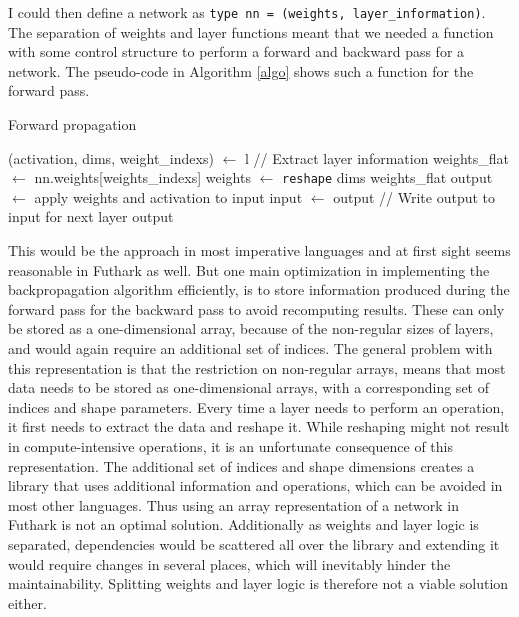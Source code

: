 I could then define a network as \texttt{type nn =  (weights,
	layer\_information)}. 
The separation of weights and layer functions meant that we needed a function
with some control structure to perform a forward and backward pass for a
network. 
The pseudo-code in Algorithm \ref{algo} shows such a function for the forward
pass.  
\begin{algorithm}[!htbp]
	\caption{Forward propagation}
	\begin{algorithmic}[1]
		\State  (activation, dims, weight\_indexs) $\gets$ l    // Extract layer
		information
		\State  weights\_flat $\gets$ nn.weights[weights\_indexs]
		\State  weights $\gets$ \texttt{reshape} dims weights\_flat
		\State  output $\gets$ apply weights and activation to input
		\State  input $\gets$ output // Write output to input for next layer  
		\EndFor
		\Return output
		\EndProcedure
	\end{algorithmic}
	\label{algo}
\end{algorithm} 
This would be the approach in most imperative languages and at first sight seems
reasonable in Futhark as well. 
But one main optimization in implementing the backpropagation algorithm
efficiently, is to store information produced during the forward pass for the
backward pass to avoid recomputing results. 
These can only be stored as a one-dimensional array, because of the non-regular
sizes of layers, and would again require an additional set of indices. 
The general problem with this representation is that the restriction on
non-regular arrays, means that most data needs to be stored as one-dimensional
arrays, with a corresponding set of indices and shape parameters. 
Every time a layer needs to perform an operation, it first needs to extract the
data and reshape it. 
While reshaping might not result in compute-intensive operations, it is an
unfortunate consequence of this representation. 
The additional set of indices and shape dimensions creates a library that uses
additional information and operations, which can be avoided in most other
languages. Thus using an array representation of a network in Futhark is not an
optimal solution. 
Additionally as weights and layer logic is separated, dependencies would be
scattered all over the library and extending it would require changes in several
places, which will inevitably hinder the maintainability. 
Splitting weights and layer logic is therefore not a viable solution either.
\newline \newline 
